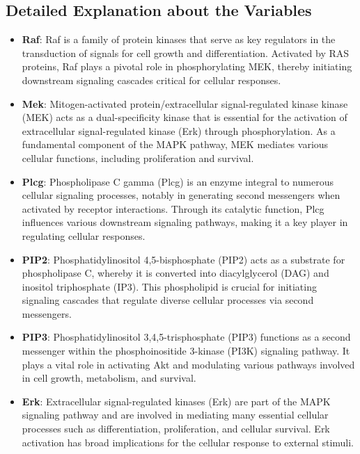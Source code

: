 \documentclass{article}
\begin{document}
\subsection{Detailed Explanation about the Variables}
\begin{itemize}
    \item \textbf{Raf}: Raf is a family of protein kinases that serve as key regulators in the transduction of signals for cell growth and differentiation. Activated by RAS proteins, Raf plays a pivotal role in phosphorylating MEK, thereby initiating downstream signaling cascades critical for cellular responses.
    
    \item \textbf{Mek}: Mitogen-activated protein/extracellular signal-regulated kinase kinase (MEK) acts as a dual-specificity kinase that is essential for the activation of extracellular signal-regulated kinase (Erk) through phosphorylation. As a fundamental component of the MAPK pathway, MEK mediates various cellular functions, including proliferation and survival.
    
    \item \textbf{Plcg}: Phospholipase C gamma (Plcg) is an enzyme integral to numerous cellular signaling processes, notably in generating second messengers when activated by receptor interactions. Through its catalytic function, Plcg influences various downstream signaling pathways, making it a key player in regulating cellular responses.
    
    \item \textbf{PIP2}: Phosphatidylinositol 4,5-bisphosphate (PIP2) acts as a substrate for phospholipase C, whereby it is converted into diacylglycerol (DAG) and inositol triphosphate (IP3). This phospholipid is crucial for initiating signaling cascades that regulate diverse cellular processes via second messengers.
    
    \item \textbf{PIP3}: Phosphatidylinositol 3,4,5-trisphosphate (PIP3) functions as a second messenger within the phosphoinositide 3-kinase (PI3K) signaling pathway. It plays a vital role in activating Akt and modulating various pathways involved in cell growth, metabolism, and survival.
    
    \item \textbf{Erk}: Extracellular signal-regulated kinases (Erk) are part of the MAPK signaling pathway and are involved in mediating many essential cellular processes such as differentiation, proliferation, and cellular survival. Erk activation has broad implications for the cellular response to external stimuli.
    

\end{itemize}
\end{document}
